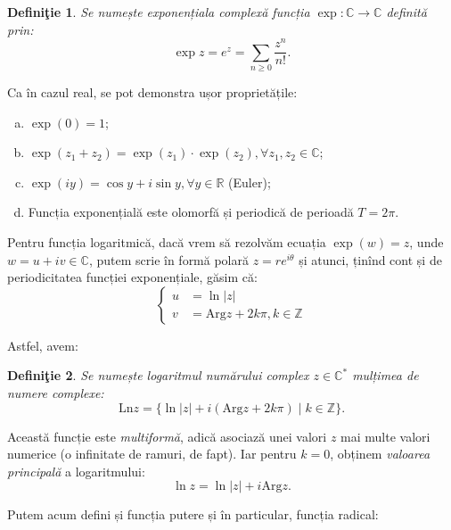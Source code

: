 \documentclass[11pt,a4paper]{article}
\newcommand\RR{\mathbb{R}}
\newcommand\ZZ{\mathbb{Z}}
\newcommand\CC{\mathbb{C}}
\theoremstyle{dotless}
\theoremstyle{dotlessdr}
\newtheorem{definition}{Defini\c{t}ie}
\begin{document}
\begin{definition}\label{def:exp-c}
  Se numește \emph{exponențiala complexă} funcția $ \exp : \CC \to \CC $
  definită prin:
  \[
    \exp z = e^z = \sum_{n \geq 0} \frac{z^n}{n!}.
  \]
\end{definition}

Ca în cazul real, se pot demonstra ușor proprietățile:
\begin{enumerate}[(a)]
\item $ \exp(0) = 1 $;
\item $ \exp(z_1 + z_2) = \exp(z_1) \cdot \exp(z_2), \forall z_1, z_2 \in \CC $;
\item $ \exp(iy) = \cos y + i \sin y, \forall y \in \RR $ (Euler);
\item Funcția exponențială este olomorfă și periodică de perioadă $ T = 2\pi $.
\end{enumerate}

\vspace{1cm}

Pentru funcția logaritmică, dacă vrem să rezolvăm ecuația $ \exp(w) = z $, unde
$ w = u + iv \in \CC $, putem scrie în formă polară $ z = re^{i\theta} $ și
atunci, ținînd cont și de periodicitatea funcției exponențiale, găsim că:
\[
  \begin{cases}
    u &= \ln |z| \\
    v &= \mathrm{Arg}z + 2k\pi, k \in \ZZ
  \end{cases}
\]

Astfel, avem:

\begin{definition}\label{def:log-c}
  Se numește \emph{logaritmul numărului complex} $ z \in \CC^\ast $ mulțimea de
  numere complexe:
  \[
    \mathrm{Ln}z = \{ \ln|z| + i (\mathrm{Arg}z + 2k\pi) \mid k \in \ZZ \}.
  \]
\end{definition}

Această funcție este \emph{multiformă}, adică asociază unei valori $ z $ mai
multe valori numerice (o infinitate de ramuri, de fapt). Iar pentru $ k = 0 $,
obținem \emph{valoarea principală} a logaritmului:
\[
  \ln z = \ln |z| + i \mathrm{Arg}z.
\]

\vspace{1cm}

Putem acum defini și funcția putere și în particular, funcția radical:
\end{document}
